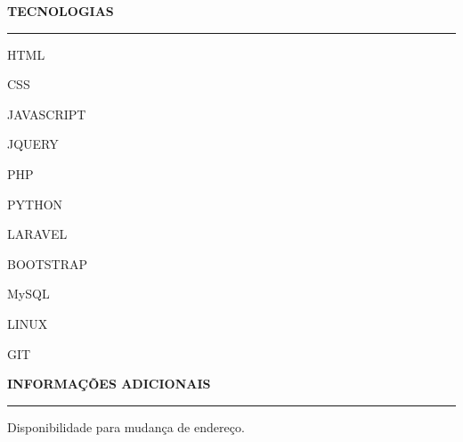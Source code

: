 \documentclass[a4paper,12pt]{article}
\begin{document}
\begin{flushleft}
\textbf{TECNOLOGIAS}
\noindent\textcolor{gray}{\rule{18cm}{1px}}
\end{flushleft}

\begin{itemize}
    \begin{item}
        HTML
    \end{item}
    \begin{item}
        CSS
    \end{item}
    \begin{item}
        JAVASCRIPT
    \end{item}
    \begin{item}
        JQUERY
    \end{item}
    \begin{item}
        PHP
    \end{item}
    \begin{item}
        PYTHON
    \end{item}
    \begin{item}
        LARAVEL
    \end{item}
    \begin{item}
        BOOTSTRAP
    \end{item}
    \begin{item}
        MySQL
    \end{item}
    \begin{item}
        LINUX
    \end{item}
    \begin{item}
        GIT
    \end{item}
    \newline
\end{itemize}

\begin{flushleft}
\textbf{INFORMA\c{C}\~{O}ES ADICIONAIS}
\noindent\textcolor{gray}{\rule{18cm}{1px}}
\end{flushleft}

\begin{itemize}
    \begin{item}
        Disponibilidade para mudan\c{c}a de endere\c{c}o.
    \end{item}
\end{itemize}
\end{document}
